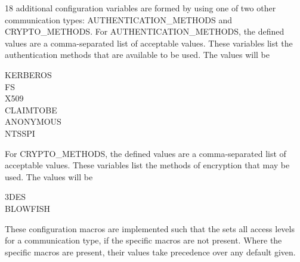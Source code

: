 









18 additional configuration variables are formed by using one
of two other communication types:
AUTHENTICATION\_METHODS and
CRYPTO\_METHODS.
For AUTHENTICATION\_METHODS,
the defined values are a comma-separated list of acceptable values.
These variables list the authentication methods that are available
to be used.
The values will be 
\begin{description}
    \item[KERBEROS]
    \item[FS]
    \item[X509]
    \item[CLAIMTOBE]
    \item[ANONYMOUS]
    \item[NTSSPI]
\end{description}

For CRYPTO\_METHODS,
the defined values are a comma-separated list of acceptable values.
These variables list the methods of encryption that may be used.
The values will be 
\begin{description}
    \item[3DES]
    \item[BLOWFISH]
\end{description}

These configuration macros are implemented such that the
 sets all access levels for a
communication type, if the specific macros are not present.
Where the specific macros are present, their values take
precedence over any default given.

